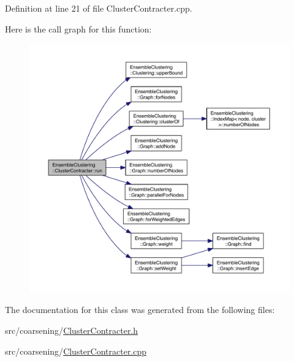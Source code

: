 Definition at line 21 of file Cluster\-Contracter.\-cpp.



Here is the call graph for this function\-:
\nopagebreak
\begin{figure}[H]
\begin{center}
\leavevmode
\includegraphics[width=350pt]{class_ensemble_clustering_1_1_cluster_contracter_a6e7b2c7b458bacd7e5868affb04adfd3_cgraph}
\end{center}
\end{figure}




The documentation for this class was generated from the following files\-:\begin{DoxyCompactItemize}
\item 
src/coarsening/\hyperlink{_cluster_contracter_8h}{Cluster\-Contracter.\-h}\item 
src/coarsening/\hyperlink{_cluster_contracter_8cpp}{Cluster\-Contracter.\-cpp}\end{DoxyCompactItemize}

